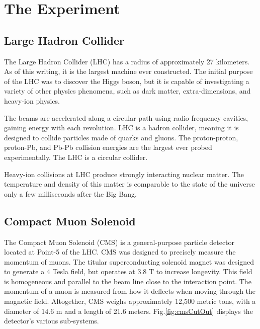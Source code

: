 
\chapter{The Experiment}

\section{Large Hadron Collider}

The Large Hadron Collider (LHC) has a radius of approximately 27 kilometers. As of this writing, it is the largest machine ever constructed. The initial purpose of the LHC was to discover the Higgs boson, but it is capable of investigating a variety of other physics phenomena, such as dark matter, extra-dimensions, and heavy-ion physics.

The beams are accelerated along a circular path using radio frequency cavities, gaining energy with each revolution. LHC is a hadron collider, meaning it is designed to collide particles made of quarks and gluons. The proton-proton, proton-Pb, and Pb-Pb collision energies are the largest ever probed experimentally. The LHC is a circular collider.

Heavy-ion collisions at LHC produce strongly interacting nuclear matter. The temperature and density of this matter is comparable to the state of the universe only a few milliseconds after the Big Bang.

\section{Compact Muon Solenoid}

The Compact Muon Solenoid (CMS) is a general-purpose particle detector located at Point-5 of the LHC. CMS was designed to precisely measure the momentum of muons. The titular superconducting solenoid magnet was designed to generate a 4 Tesla field, but operates at 3.8 T to increase longevity. This field is homogeneous and parallel to the beam line close to the interaction point. The momentum of a muon is measured from how it deflects when moving through the magnetic field. Altogether, CMS weighs approximately 12,500 metric tons, with a diameter of 14.6 m and a length of 21.6 meters. Fig.\ref{fig:cmsCutOut} displays the detector's various sub-systems. 

